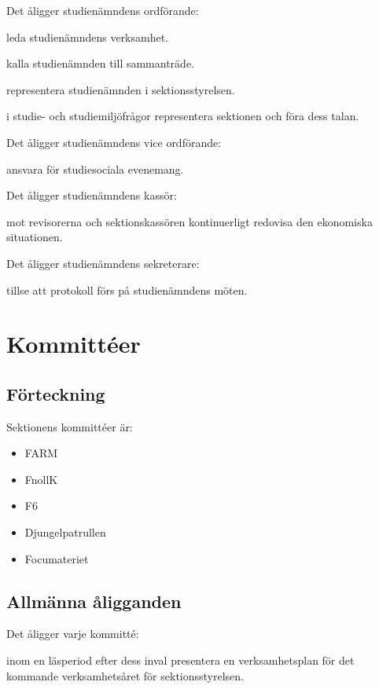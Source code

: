 \documentclass{styrdokument}
\begin{document}
\? Det åligger studienämndens ordförande:
\begin{aligganden}
    \item leda studienämndens verksamhet.
    \item kalla studienämnden till sammanträde.
    \item representera studienämnden i sektionsstyrelsen.
    \item i studie- och studiemiljöfrågor representera sektionen och föra dess talan.
\end{aligganden}

\? Det åligger studienämndens vice ordförande:
\begin{aligganden}
    \item ansvara för studiesociala evenemang.
\end{aligganden}

\? Det åligger studienämndens kassör:
\begin{aligganden}
    \item mot revisorerna och sektionskassören kontinuerligt redovisa den ekonomiska situationen. 
\end{aligganden}

\? Det åligger studienämndens sekreterare:
\begin{aligganden}
     \item tillse att protokoll förs på studienämndens möten.
\end{aligganden}

\section{Kommittéer}
\subsection{Förteckning}
\? Sektionens kommittéer är:
\begin{itemize}
    \item FARM
	\item FnollK
	\item F6
	\item Djungelpatrullen
	\item Focumateriet
\end{itemize}

\subsection{Allmänna åligganden}
\? Det åligger varje kommitté:
\begin{aligganden}
    \item inom en läsperiod efter dess inval presentera en verksamhetsplan för det kommande verksamhetsåret för sektionsstyrelsen. 
\end{aligganden}
\end{document}
